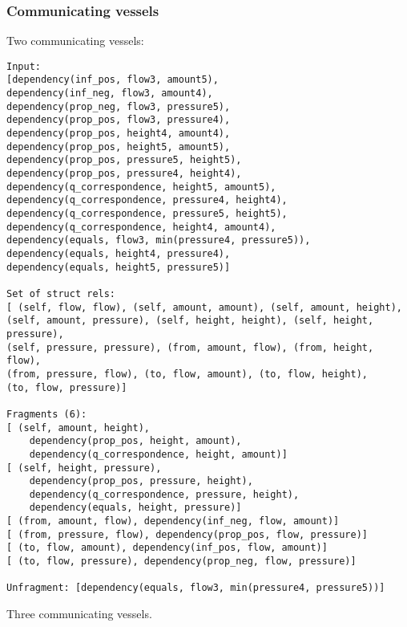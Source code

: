 \documentclass{article}
\begin{document}
\subsubsection{Communicating vessels} 
Two communicating vessels:

\begin{verbatim}
Input: 
[dependency(inf_pos, flow3, amount5), 
dependency(inf_neg, flow3, amount4), 
dependency(prop_neg, flow3, pressure5), 
dependency(prop_pos, flow3, pressure4), 
dependency(prop_pos, height4, amount4), 
dependency(prop_pos, height5, amount5), 
dependency(prop_pos, pressure5, height5), 
dependency(prop_pos, pressure4, height4), 
dependency(q_correspondence, height5, amount5), 
dependency(q_correspondence, pressure4, height4), 
dependency(q_correspondence, pressure5, height5), 
dependency(q_correspondence, height4, amount4), 
dependency(equals, flow3, min(pressure4, pressure5)), 
dependency(equals, height4, pressure4), 
dependency(equals, height5, pressure5)]

Set of struct rels: 
[ (self, flow, flow), (self, amount, amount), (self, amount, height), 
(self, amount, pressure), (self, height, height), (self, height, pressure),
(self, pressure, pressure), (from, amount, flow), (from, height, flow), 
(from, pressure, flow), (to, flow, amount), (to, flow, height), 
(to, flow, pressure)]

Fragments (6):
[ (self, amount, height), 
	dependency(prop_pos, height, amount), 
	dependency(q_correspondence, height, amount)]
[ (self, height, pressure), 
	dependency(prop_pos, pressure, height), 
	dependency(q_correspondence, pressure, height), 
	dependency(equals, height, pressure)]
[ (from, amount, flow), dependency(inf_neg, flow, amount)]
[ (from, pressure, flow), dependency(prop_pos, flow, pressure)]
[ (to, flow, amount), dependency(inf_pos, flow, amount)]
[ (to, flow, pressure), dependency(prop_neg, flow, pressure)]

Unfragment: [dependency(equals, flow3, min(pressure4, pressure5))]
\end{verbatim}

Three communicating vessels.
\end{document}
